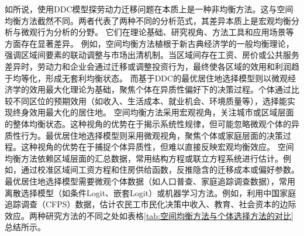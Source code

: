 \documentclass[a4paper,12pt,oneside, fontset=mac]{ctexbook} %
\begin{document}
如\cite{jiaEconomicsInternalMigration2023}所说，使用DDC模型探劳动力迁移问题在本质上是一种非均衡方法。这与空间均衡方法截然不同。两者代表了两种不同的分析范式，其差异本质上是宏观均衡分析与微观行为分析的分野。
它们在理论基础、研究视角、方法工具和应用场景等方面存在显著差异。
例如，空间均衡方法植根于新古典经济学的一般均衡理论，强调区域间要素的联动调整与市场出清机制。当区域间存在工资、房价或公共服务差异时，劳动力和企业会通过迁移或调整投资行为，最终使各区域的效用和利润趋于均等化，形成无套利均衡状态。
而基于DDC的最优居住地选择模型则以微观经济学的效用最大化理论为基础，聚焦个体在异质性偏好下的决策过程。个体通过比较不同区位的预期效用（如收入、生活成本、就业机会、环境质量等），选择能实现终身效用最大化的居住地。
空间均衡方法采用宏观视角，关注城市或区域层面的整体均衡状态。这种视角的优势在于揭示系统性规律，但可能忽略微观个体的异质性行为。最优居住地选择模型则采用微观视角，聚焦个体或家庭层面的决策过程。这种视角的优势在于捕捉个体异质性，但难以直接反映宏观均衡效应。
空间均衡方法依赖区域层面的汇总数据，常用结构方程或联立方程系统进行估计。例如，通过校准区域间工资方程和住房供给函数，反推隐含的迁移成本或偏好参数。最优居住地选择模型需要微观个体数据（如人口普查、家庭追踪调查数据），常用离散选择模型（如条件Logit、嵌套Logit）或机器学习方法。例如，利用中国家庭追踪调查（CFPS）数据，估计农民工市民化决策中收入、教育、社会资本的边际效应。两种研究方法的不同之处如表格\ref{tab:空间均衡方法与个体选择方法的对比}总结所示。
\end{document}
